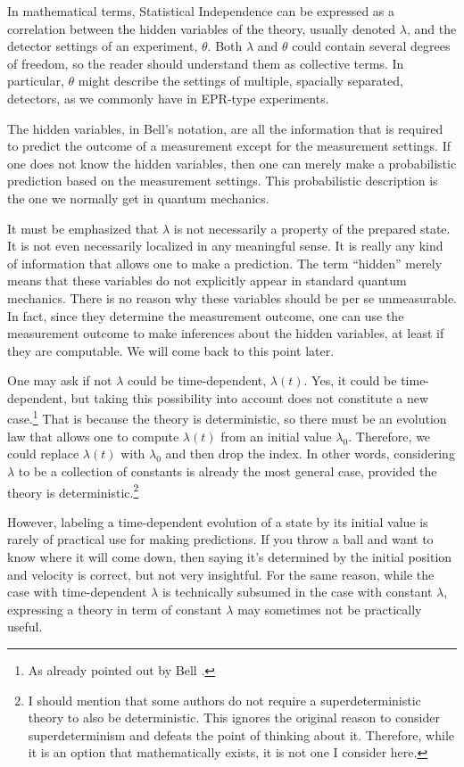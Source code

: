 \documentclass[12pt,A4]{article}
\begin{document}
In mathematical terms, Statistical Independence can be expressed as a correlation between the hidden
variables of the theory, usually denoted $\lambda$, and the detector settings of an experiment, $\theta$. 
Both $\lambda$ and $\theta$ could contain several degrees of freedom, so the reader should understand
them as collective terms. In particular, $\theta$ might describe the settings of multiple, spacially separated, detectors,
as we commonly have in {\sc EPR}-type experiments.

The hidden variables, in Bell's notation, are all the information that is required to predict the outcome
of a measurement except for the measurement settings. If one does not know the hidden variables, 
then one can merely make a probabilistic prediction based on the measurement settings. 
This probabilistic description is the one we normally get in quantum mechanics.

It must be emphasized that $\lambda$ is not necessarily a property of the prepared state. It is not
even necessarily localized in any meaningful sense. It is really any kind of information that allows one to make a prediction.
The term ``hidden'' merely means that these variables do not explicitly appear in standard 
quantum mechanics. There is no reason why these  variables should be per se unmeasurable. In fact, since they determine the measurement outcome, one can use the measurement
outcome to make inferences about the hidden variables, at least if they are computable. We will come
back to this point later.

One may ask if not $\lambda$ could be time-dependent, $\lambda(t)$. Yes, it could be time-dependent, but taking this
possibility into account does not constitute a new case.\footnote{As already pointed out by Bell \cite{Bell:1987hh}.} That is because the theory is deterministic, 
so there must be an evolution law that allows one to compute $\lambda(t)$ from an initial value $\lambda_0$. 
Therefore, we could replace $\lambda(t)$ with $\lambda_0$ and then drop the index. In other words, considering
$\lambda$ to be a collection of constants is already the most general case, provided the theory is deterministic.\footnote{I should mention that some 
authors do not require a superdeterministic theory to also be deterministic. This ignores the original reason to consider 
superdeterminism and defeats the point of thinking about it. Therefore, while it is an option that mathematically exists, it is
not one I consider here.} 

However, labeling a time-dependent evolution of a state by its initial value is rarely of
practical use for making predictions. If you throw a ball and want to know where it will come down, then saying it's determined by the initial
position and velocity is correct, but not very insightful. For the same reason, while the case with time-dependent $\lambda$ is technically subsumed in the case with constant $\lambda$, expressing a theory in term of constant $\lambda$ may sometimes not be practically useful. 
\end{document}
